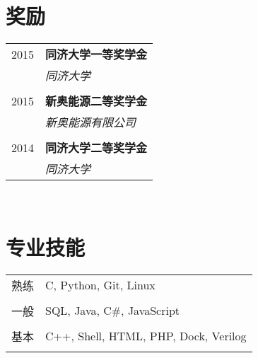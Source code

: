 \documentclass[10pt]{article} %
\begin{document}
{{\begin{minipage}[t]{0.44\textwidth}

\section{奖励} 

\begin{tabular}{rl}
2015	 & \textbf{同济大学一等奖学金}\\
& \textit{同济大学}\\ \\


2015	 & \textbf{新奥能源二等奖学金}\\
& \textit{新奥能源有限公司}\\ \\


2014	 & \textbf{同济大学二等奖学金}\\
& \textit{同济大学}

\end{tabular}\\[10pt]







\section{专业技能} 

\begin{tabular}{rl}
熟练
& C, Python, Git, Linux\\ 
& \\
一般
& SQL, Java, C\#, JavaScript\\
& \\
基本
& C++, Shell, HTML, PHP, Dock, Verilog\\
& \\
\end{tabular}

	
\end{minipage} %

}}
\end{document}
